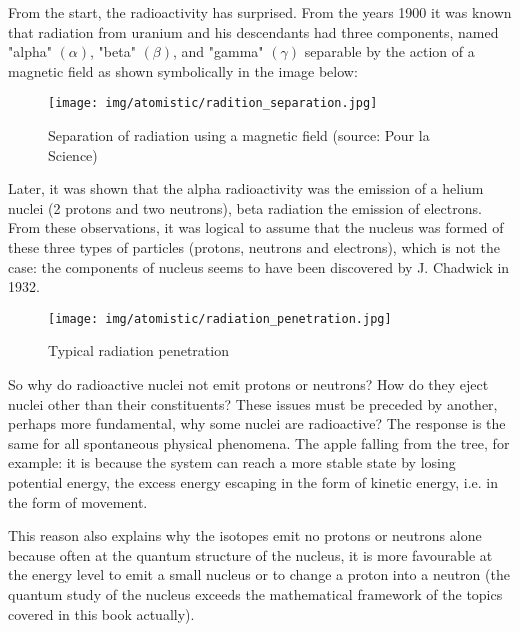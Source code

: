 	From the start, the radioactivity has surprised. From the years 1900 it was known that radiation from uranium and his descendants had three components, named "alpha" $(\alpha)$, "beta" $(\beta)$, and "gamma" $(\gamma)$ separable by the action of a magnetic field as shown symbolically in the image below:
	\begin{figure}[H]
		\begin{center}
		\texttt{[image: img/atomistic/radition\_separation.jpg]}
		\end{center}	
		\caption[Separation of radiation using a magnetic field]{Separation of radiation using a magnetic field (source: Pour la Science)}
	\end{figure}
	Later, it was shown that the alpha radioactivity was the emission of a helium nuclei (2 protons and two neutrons), beta radiation the emission of electrons. From these observations, it was logical to assume that the nucleus was formed of these three types of particles (protons, neutrons and electrons), which is not the case: the  components of nucleus seems to have been discovered by J. Chadwick in 1932.
	\begin{figure}[H]
		\begin{center}
		\texttt{[image: img/atomistic/radiation\_penetration.jpg]}
		\end{center}	
		\caption{Typical radiation penetration}
	\end{figure}
	
	So why do radioactive nuclei not emit protons or neutrons? How do they eject nuclei other than their constituents? These issues must be preceded by another, perhaps more fundamental, why some nuclei are radioactive? The response is the same for all spontaneous physical phenomena. The apple falling from the tree, for example: it is because the system can reach a more stable state by losing potential energy, the excess energy escaping in the form of kinetic energy, i.e. in the form of movement.
	
	This reason also explains why the isotopes emit no protons or neutrons alone because often at the quantum structure of the nucleus, it is more favourable at the energy level to emit a small nucleus or to change a proton into a neutron (the quantum study of the nucleus exceeds the mathematical framework of the topics covered in this book actually).
	
